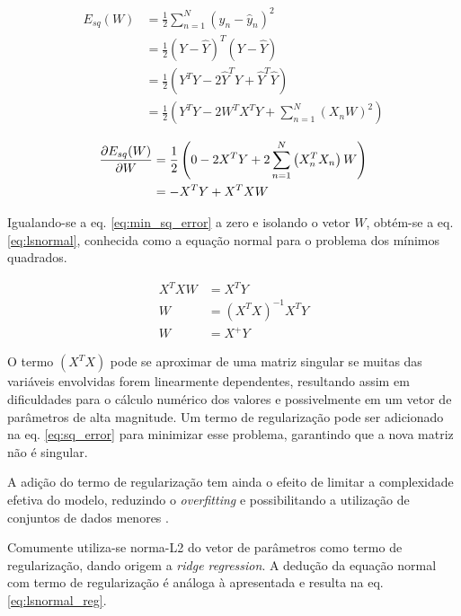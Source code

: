 \begin{equation}
\begin{split}
      E_{sq}(W) {}&= \frac{1}{2} \sum_{n = 1}^{N}\left(y_n-\hat{y}_n\right)^2 \\
      &= \frac{1}{2} (Y-\hat{Y})^T(Y-\hat{Y})\\
      &= \frac{1}{2} \left( Y^TY - 2 \hat{Y}^TY + \hat{Y}^T\hat{Y} \right)\\
      &= \frac{1}{2} \left( Y^TY - 2 W^TX^TY + \sum_{n = 1}^{N}\left(X_nW \right)^2 \right)
    \label{eq:sq_error}  
\end{split}
\end{equation}

\begin{equation}\begin{split}
    \pdv{E_{sq}(W)}{W} &= \frac{1}{2} \left( 0 - 2 X^TY + 2\sum_{n = 1}^{N}\left(X_n^TX_n \right)W  \right) \\
    &= - X^TY + X^TX W
    \label{eq:min_sq_error}
\end{split}\end{equation}

Igualando-se a eq. \ref{eq:min_sq_error} a zero e isolando o vetor $W$, obtém-se a eq. \ref{eq:lsnormal}, conhecida como a equação normal para o problema dos mínimos quadrados.

\begin{equation}\begin{split}
    X^TX W &= X^TY \\
    W &= (X^TX)^{-1}X^TY \\
    W &=X^+ Y
    \label{eq:lsnormal}
\end{split}\end{equation}

O termo $(X^TX)$ pode se aproximar de uma matriz singular se muitas das variáveis envolvidas forem 
linearmente dependentes, resultando assim em dificuldades para o cálculo numérico dos valores e possivelmente em 
um vetor de parâmetros de alta magnitude. Um termo de regularização pode ser adicionado na eq. \ref{eq:sq_error} 
para minimizar esse problema, garantindo que a nova matriz não é singular.

A adição do termo de regularização tem ainda o efeito de limitar a complexidade efetiva do modelo, reduzindo o 
\textit{overfitting} e possibilitando a utilização de conjuntos de dados menores \cite{bishop_2006}.

Comumente utiliza-se norma-L2 do vetor de parâmetros como termo de regularização, dando origem a \textit{ridge 
regression}. A dedução da equação normal com termo de regularização é análoga à apresentada e resulta na eq. 
\ref{eq:lsnormal_reg}.

